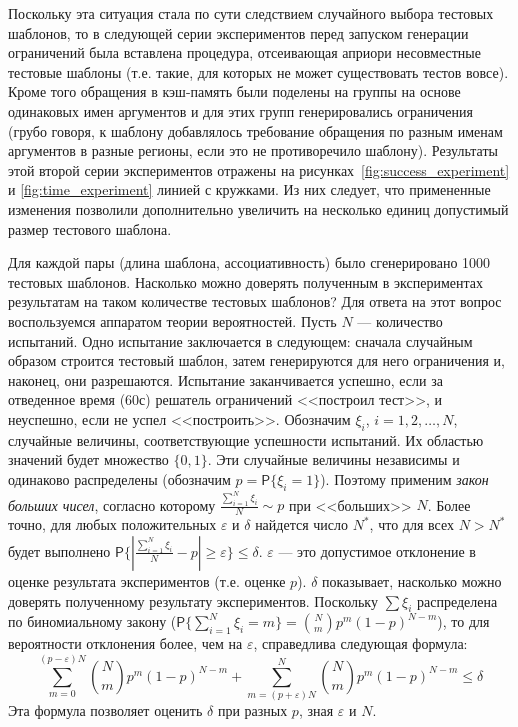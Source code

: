 Поскольку эта ситуация стала по сути следствием случайного выбора тестовых
шаблонов, то в следующей серии экспериментов перед запуском генерации
ограничений была вставлена процедура, отсеивающая априори несовместные тестовые
шаблоны (т.е. такие, для которых не может существовать тестов вовсе). Кроме того
обращения в кэш-память были поделены на группы на основе одинаковых имен
аргументов и для этих групп генерировались ограничения (грубо говоря, к шаблону
добавлялось требование обращения по разным именам аргументов в разные регионы,
если это не противоречило шаблону). Результаты этой второй серии экспериментов
отражены на рисунках~\ref{fig:success_experiment} и \ref{fig:time_experiment}
линией с кружками. Из них следует, что примененные изменения позволили
дополнительно увеличить на несколько единиц допустимый размер тестового шаблона.

Для каждой пары (длина шаблона, ассоциативность) было сгенерировано 1000
тестовых шаблонов. Насколько можно доверять полученным в экспериментах
результатам на таком количестве тестовых шаблонов? Для ответа на этот вопрос воспользуемся аппаратом теории
вероятностей. Пусть $N$ --- количество испытаний. Одно испытание заключается в
следующем: сначала случайным образом строится тестовый шаблон, затем генерируются
для него ограничения и, наконец, они разрешаются. Испытание заканчивается успешно, если за отведенное время (60с) решатель ограничений <<построил тест>>, и неуспешно, если не успел <<построить>>.
Обозначим  $\xi_i$, $i = 1, 2, \dots, N$, случайные величины, соответствующие
успешности испытаний. Их областью значений будет множество $\{0, 1\}$. Эти
случайные величины независимы и одинаково распределены (обозначим $p =
\mathsf{P}\{\xi_i = 1\}$). Поэтому применим \emph{закон больших чисел}, согласно
которому $\frac{\sum_{i=1}^N \xi_i}{N} \sim p$ при <<больших>> $N$. Более точно, для любых
положительных $\varepsilon$ и $\delta$ найдется число $N^*$, что для всех $N > N^*$ будет
выполнено $\mathsf{P}\{|\frac{\sum_{i=1}^N \xi_i}{N} - p | \geq \varepsilon\} \leq \delta$. $\varepsilon$ --- это допустимое отклонение в оценке результата экспериментов (т.е. оценке $p$). $\delta$ показывает, насколько можно доверять полученному результату экспериментов. Поскольку $\sum \xi_i$ распределена по биномиальному закону ($\mathsf{P}\{\sum_{i=1}^N \xi_i = m\} = \binom{N}{m} p^m (1{-}p)^{N{-}m}$), то для вероятности отклонения более, чем на $\varepsilon$, справедлива следующая формула: $$\sum_{m = 0}^{(p-\varepsilon)N} \binom{N}{m} p^m (1{-}p)^{N{-}m} + \sum_{m = (p+\varepsilon)N}^N \binom{N}{m} p^m (1{-}p)^{N{-}m} \leq \delta$$ Эта формула позволяет оценить $\delta$ при разных $p$, зная $\varepsilon$ и $N$.

